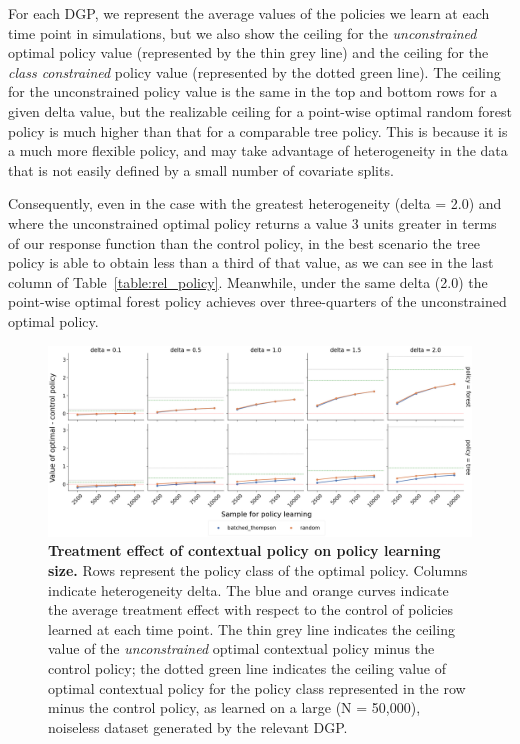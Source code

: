 \documentclass[letterpaper, 12pt, parskip=full,DIV=10]{scrartcl}
\begin{document}
For each DGP, we represent the average values of the policies we learn at each time point in simulations, but we also show the ceiling for the \textit{unconstrained} optimal policy value (represented by the thin grey line) and the ceiling for the \textit{class constrained} policy value (represented by the dotted green line). The ceiling for the unconstrained policy value is the same in the top and bottom rows for a given delta value, but the realizable ceiling for a point-wise optimal random forest policy is much higher than that for a comparable tree policy. This is because it is a much more flexible policy, and may take advantage of heterogeneity in the data that is not easily defined by a small number of covariate splits. 

Consequently, even in the case with the greatest heterogeneity (delta = 2.0) and where the unconstrained optimal policy returns a value 3 units greater in terms of our response function than the control policy, in the best scenario the tree policy is able to obtain less than a third of that value, as we can see in the last column of Table~\ref{table:rel_policy}. Meanwhile, under the same delta (2.0) the point-wise optimal forest policy achieves over three-quarters of the unconstrained optimal policy. 

\begin{figure}[H]
\centering
\includegraphics[width=\textwidth]{figures/value_opt_ctr_diff.png}
\caption{\textbf{Treatment effect of contextual policy on policy learning size.} Rows represent the policy class of the optimal policy.  Columns indicate heterogeneity delta. The blue and orange curves indicate the average treatment effect with respect to the control of policies {learned} at each time point.  The thin grey line indicates the ceiling value of the \textit{unconstrained} optimal contextual policy minus the control policy; the dotted green line indicates the ceiling value of optimal contextual policy for the policy class represented in the row minus the control policy, as learned on a large (N = 50,000), noiseless dataset generated by the relevant DGP.}
\label{fig:value_opt}
\end{figure}\FloatBarrier
\end{document}
